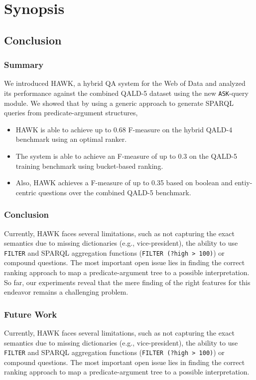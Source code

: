 \chapter{Synopsis}



\section{Conclusion}
\label{chahawk:sec:conclusion}
\subsection*{Summary}
We introduced HAWK, a hybrid \ac{QA} system for the Web of Data and analyzed its performance against the combined \ac{QALD}-5 dataset using the new \texttt{ASK}-query module. 
We showed that by using a generic approach to generate SPARQL queries from predicate-argument structures, 
\begin{itemize}
\item HAWK is able to achieve up to 0.68 F-measure on the hybrid \ac{QALD}-4 benchmark using an optimal ranker.
\item The system is able to achieve an F-measure of up to 0.3 on the \ac{QALD}-5 training benchmark using bucket-based ranking.
\item Also, HAWK achieves a F-measure of up to 0.35 based on boolean and entiy-centric questions over the combined \ac{QALD}-5 benchmark.
\end{itemize}

\subsection*{Conclusion}
Currently, HAWK faces several limitations, such as not capturing the exact semantics due to missing dictionaries (e.g., vice-president), the ability to use \texttt{FILTER} and SPARQL aggregation functions (\texttt{FILTER (?high > 100)}) or compound questions. 
The most important open issue lies in finding the correct ranking approach to map a predicate-argument tree to a possible interpretation. 
So far, our experiments reveal that the mere finding of the right features for this endeavor remains a challenging problem. 

\subsection*{Future Work}
Currently, HAWK faces several limitations, such as not capturing the exact semantics due to missing dictionaries (e.g., vice-president), the ability to use \texttt{FILTER} and SPARQL aggregation functions (\texttt{FILTER (?high > 100)}) or compound questions. 
The most important open issue lies in finding the correct ranking approach to map a predicate-argument tree to a possible interpretation. 


